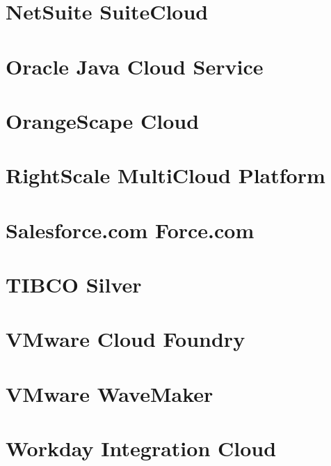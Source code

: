 \section{NetSuite SuiteCloud}

\section{Oracle Java Cloud Service}

\section{OrangeScape Cloud}

\section{RightScale MultiCloud Platform}

\section{Salesforce.com Force.com}

\section{TIBCO Silver}

\section{VMware Cloud Foundry}

\section{VMware WaveMaker}

\section{Workday Integration Cloud}